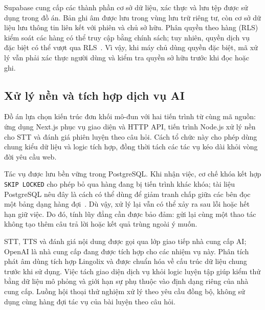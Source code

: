 \documentclass[12pt,a4paper,oneside]{report}
\begin{document}
Supabase cung cấp các thành phần cơ sở dữ liệu, xác thực và lưu tệp được sử dụng trong đồ án. Bản ghi âm được lưu trong vùng lưu trữ riêng tư, còn cơ sở dữ liệu lưu thông tin liên kết với phiên và chủ sở hữu. Phân quyền theo hàng (RLS) kiểm soát các hàng có thể truy cập bằng chính sách; tuy nhiên, quyền dịch vụ đặc biệt có thể vượt qua RLS~\cite{supabase-rls}. Vì vậy, khi máy chủ dùng quyền đặc biệt, mã xử lý vẫn phải xác thực người dùng và kiểm tra quyền sở hữu trước khi đọc hoặc ghi.

\subsection{Xử lý nền và tích hợp dịch vụ AI}

Đồ án lựa chọn kiến trúc đơn khối mô-đun với hai tiến trình từ cùng mã nguồn: ứng dụng Next.js phục vụ giao diện và HTTP API, tiến trình Node.js xử lý nền cho STT và đánh giá phiên luyện theo câu hỏi. Cách tổ chức này cho phép dùng chung kiểu dữ liệu và logic tích hợp, đồng thời tách các tác vụ kéo dài khỏi vòng đời yêu cầu web.

Tác vụ được lưu bền vững trong PostgreSQL. Khi nhận việc, cơ chế khóa kết hợp \texttt{SKIP LOCKED} cho phép bỏ qua hàng đang bị tiến trình khác khóa; tài liệu PostgreSQL nêu đây là cách có thể dùng để giảm tranh chấp giữa các bên đọc một bảng dạng hàng đợi~\cite{postgres-select}. Dù vậy, xử lý lại vẫn có thể xảy ra sau lỗi hoặc hết hạn giữ việc. Do đó, tính lũy đẳng cần được bảo đảm: gửi lại cùng một thao tác không tạo thêm câu trả lời hoặc kết quả trùng ngoài ý muốn.

STT, TTS và đánh giá nội dung được gọi qua lớp giao tiếp nhà cung cấp AI; OpenAI là nhà cung cấp đang được tích hợp cho các nhiệm vụ này. Phân tích phát âm dùng tích hợp Lingolix và được chuẩn hóa về cấu trúc dữ liệu chung trước khi sử dụng. Việc tách giao diện dịch vụ khỏi logic luyện tập giúp kiểm thử bằng dữ liệu mô phỏng và giới hạn sự phụ thuộc vào định dạng riêng của nhà cung cấp. Luồng hội thoại thử nghiệm xử lý theo yêu cầu đồng bộ, không sử dụng cùng hàng đợi tác vụ của bài luyện theo câu hỏi.
\end{document}
